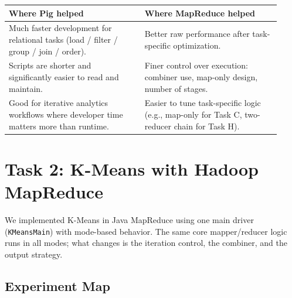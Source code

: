 \documentclass[11pt]{article}
\begin{document}
\begin{longtable}{@{}p{0.46\linewidth}p{0.46\linewidth}@{}}
  \rowcolor{tableheader}
  \color{white}\textbf{Where Pig helped} &
  \color{white}\textbf{Where MapReduce helped} \\
  \midrule\endhead
  Much faster development for relational tasks (load / filter / group / join / order). &
  Better raw performance after task-specific optimization. \\
  \rowcolor{tablealt}
  Scripts are shorter and significantly easier to read and maintain. &
  Finer control over execution: combiner use, map-only design, number of stages. \\
  Good for iterative analytics workflows where developer time matters more than runtime. &
  Easier to tune task-specific logic (e.g., map-only for Task C, two-reducer chain for Task H). \\
\end{longtable}

\section{Task 2: K-Means with Hadoop MapReduce}

We implemented K-Means in Java MapReduce using one main driver (\texttt{KMeansMain}) with mode-based behavior. The same core mapper/reducer logic runs in all modes; what changes is the iteration control, the combiner, and the output strategy.

\subsection{Experiment Map}
\end{document}

